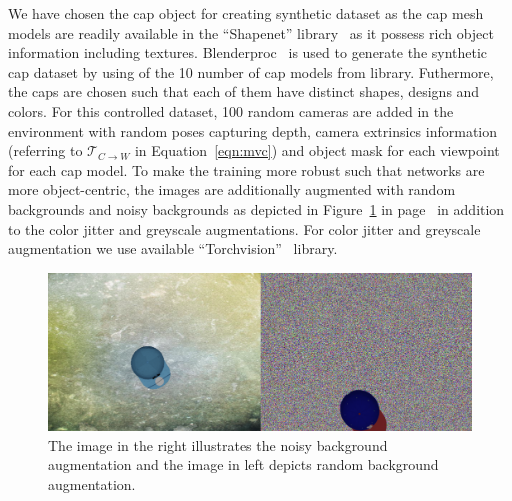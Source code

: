 We have chosen the cap object for creating synthetic dataset as the cap mesh models are readily available in the ``Shapenet'' library~\cite{chang2015shapenet}
as it possess rich object information including textures.
Blenderproc~\cite{blenderproc} is used to generate the synthetic cap dataset by using of the 10 number of cap models from \cite{chang2015shapenet} library.
Futhermore, the caps are chosen such that each of them have distinct shapes, designs and colors.
For this controlled dataset, 100 random cameras are added in the environment with random poses capturing depth,
camera extrinsics information (referring to $\mathcal{T}_{C \rightarrow W}$ in Equation~\ref{eqn:mvc}) and object mask for each viewpoint for each cap model.
To make the training more robust such that networks are more object-centric, the images are additionally augmented with random backgrounds and noisy backgrounds
as depicted in Figure~\ref{fig:back_augmentations} in page~\pageref{fig:back_augmentations}
in addition to the color jitter and greyscale augmentations. For color jitter and greyscale augmentation we use available ``Torchvision''~\cite{marcel2010torchvision} library.


\begin{figure}[htb]
    \centering
    \includegraphics[scale=0.2]{images/back_augs.png}
    \caption{The image in the right illustrates the noisy background augmentation and the image in left depicts random background augmentation.}
    \label{fig:back_augmentations}

\end{figure}